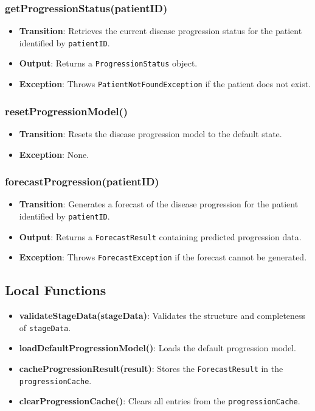 \documentclass[12pt, titlepage]{article}
\begin{document}
\subsubsection{getProgressionStatus(patientID)}
\begin{itemize}
    \item \textbf{Transition}: Retrieves the current disease progression status for the patient identified by \texttt{patientID}.
    \item \textbf{Output}: Returns a \texttt{ProgressionStatus} object.
    \item \textbf{Exception}: Throws \texttt{PatientNotFoundException} if the patient does not exist.
\end{itemize}

\subsubsection{resetProgressionModel()}
\begin{itemize}
    \item \textbf{Transition}: Resets the disease progression model to the default state.
    \item \textbf{Exception}: None.
\end{itemize}

\subsubsection{forecastProgression(patientID)}
\begin{itemize}
    \item \textbf{Transition}: Generates a forecast of the disease progression for the patient identified by \texttt{patientID}.
    \item \textbf{Output}: Returns a \texttt{ForecastResult} containing predicted progression data.
    \item \textbf{Exception}: Throws \texttt{ForecastException} if the forecast cannot be generated.
\end{itemize}

\subsection{Local Functions}
\begin{itemize}
    \item \textbf{validateStageData(stageData)}: Validates the structure and completeness of \texttt{stageData}.
    \item \textbf{loadDefaultProgressionModel()}: Loads the default progression model.
    \item \textbf{cacheProgressionResult(result)}: Stores the \texttt{ForecastResult} in the \texttt{progressionCache}.
    \item \textbf{clearProgressionCache()}: Clears all entries from the \texttt{progressionCache}.
\end{itemize}
\end{document}
